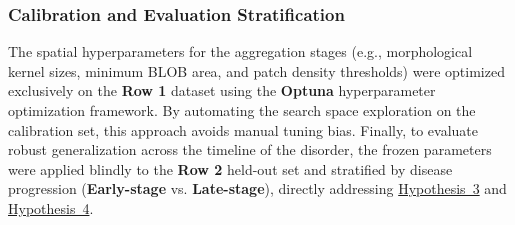
\FloatBarrier
\subsubsection{Calibration and Evaluation Stratification}
\noindent
The spatial hyperparameters for the aggregation stages (e.g., morphological kernel sizes, minimum BLOB area, and patch density thresholds) were optimized exclusively on the \textbf{Row 1} dataset using the \textbf{Optuna} hyperparameter optimization framework. By automating the search space exploration on the calibration set, this approach avoids manual tuning bias. Finally, to evaluate robust generalization across the timeline of the disorder, the frozen parameters were applied blindly to the \textbf{Row 2} held-out set and stratified by disease progression (\textbf{Early-stage} vs. \textbf{Late-stage}), directly addressing \hyperref[hyp:whole_image_robustness]{Hypothesis~3} and \hyperref[hyp:early_detection]{Hypothesis~4}.
\FloatBarrier


